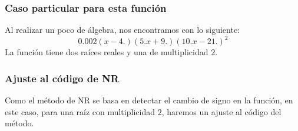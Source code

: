 \begin{frame}
\frametitle{Caso particular para esta función}
Al realizar un poco de álgebra, nos encontramos con lo siguiente:
\[ 0.002 (x - 4.) (5. x + 9.) (10. x - 21.)^{2} \]
La función tiene dos raíces reales y una de multiplicidad $2$.
\end{frame}
\begin{frame}
\frametitle{Ajuste al código de NR}
Como el método de NR se basa en detectar el cambio de signo en la función, en este caso, para una raíz con multiplicidad $2$, haremos un ajuste al código del método.
\end{frame} 	



